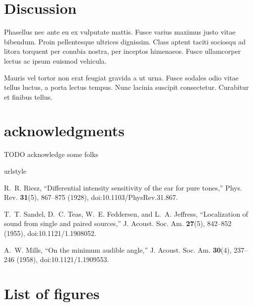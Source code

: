\documentclass[12pt,oneside]{article}
\renewcommand{\url}{\begingroup \def\UrlLeft{}\def\UrlRight{}\urlstyle{same}\Url}
\begin{document}
\section{Discussion}\label{discussion}

Phasellus nec ante eu ex vulputate mattis. Fusce varius maximus justo
vitae bibendum. Proin pellentesque ultrices dignissim. Class aptent
taciti sociosqu ad litora torquent per conubia nostra, per inceptos
himenaeos. Fusce ullamcorper lectus ac ipsum euismod vehicula.

Mauris vel tortor non erat feugiat gravida a ut urna. Fusce sodales odio
vitae tellus luctus, a porta lectus tempus. Nunc lacinia suscipit
consectetur. Curabitur et finibus tellus.

\cleardoublepage

\section*{acknowledgments}TODO acknowledge some folks\cleardoublepage


\begin{thebibliography}{1}
\newcommand{\enquote}[1]{``#1''}
\providecommand{\url}[1]{\texttt{#1}}
\providecommand{\urlprefix}{URL }
\expandafter\ifx\csname urlstyle\endcsname\relax
  \providecommand{\doi}[1]{doi:\discretionary{}{}{}#1}\else
  \providecommand{\doi}{doi:\discretionary{}{}{}\begingroup
  \urlstyle{rm}\Url}\fi

R.~R. Riesz, \enquote{Differential intensity sensitivity of the ear for pure
  tones,} Phys. Rev. \textbf{31}(5), 867--875 (1928),
  \doi{10.1103/PhysRev.31.867}.

T.~T. Sandel, D.~C. Teas, W.~E. Feddersen, and L.~A. Jeffress,
  \enquote{Localization of sound from single and paired sources,} J. Acoust.
  Soc. Am. \textbf{27}(5), 842--852 (1955), \doi{10.1121/1.1908052}.

A.~W. Mills, \enquote{On the minimum audible angle,} J. Acoust. Soc. Am.
  \textbf{30}(4), 237--246 (1958), \doi{10.1121/1.1909553}.

\end{thebibliography}


\cleardoublepage
\processdelayedfloats
\cleardoublepage
\section*{List of figures}
\end{document}
